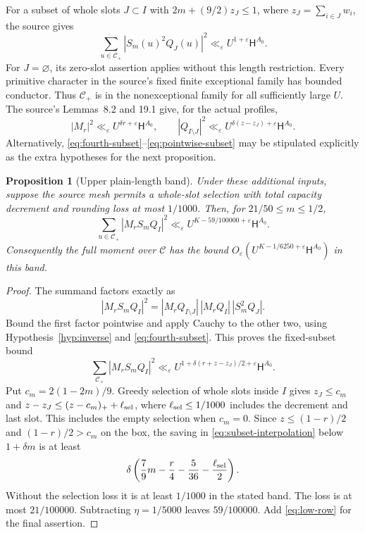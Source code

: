 \documentclass[11pt]{article}
\newtheorem{proposition}[theorem]{Proposition}
\theoremstyle{definition}
\theoremstyle{remark}
\numberwithin{equation}{section}
\newcommand{\CC}{\mathcal C}
\newcommand{\HH}{\mathsf H}
\newcommand{\ee}{\varepsilon}
\begin{document}
For a subset of whole slots $J\subset I$ with
$2m+(9/2)z_J\le1$, where $z_J=\sum_{i\in J}w_i$, the source gives
\begin{equation}\label{eq:fourth-subset}
\sum_{u\in\CC_+}|S_m(u)^2Q_J(u)|^2
\ll_\ee U^{1+\ee}\HH^{A_0}.
\end{equation}
For $J=\varnothing$, its zero-slot assertion applies without this
length restriction. Every primitive character in the source's fixed
finite exceptional family has bounded conductor. Thus $\CC_+$ is
in the nonexceptional family for all sufficiently large $U$.
The source's Lemmas~8.2 and 19.1 give, for the actual profiles,
\begin{equation}\label{eq:pointwise-subset}
|M_r|^2\ll_\ee U^{\delta r+\ee}\HH^{A_0},\qquad
|Q_{I\setminus J}|^2\ll_\ee
 U^{\delta(z-z_J)+\ee}\HH^{A_0}.
\end{equation}
Alternatively, \eqref{eq:fourth-subset}--\eqref{eq:pointwise-subset}
may be stipulated explicitly as the extra hypotheses for the next
proposition.

\begin{proposition}[Upper plain-length band]\label{prop:upper-band}
Under these additional inputs, suppose the source mesh permits a
whole-slot selection with total capacity decrement and rounding loss
at most $1/1000$. Then, for $21/50\le m\le1/2$,
\begin{equation}\label{eq:upper-band}
\sum_{u\in\CC_+}|M_rS_mQ_I|^2
\ll_\ee U^{K-59/100000+\ee}\HH^{A_0}.
\end{equation}
Consequently the full moment over $\CC$ has the bound
$O_\ee(U^{K-1/6250+\ee}\HH^{A_0})$ in this band.
\end{proposition}
\begin{proof}
The summand factors exactly as
\[
|M_rS_mQ_I|^2
=|M_rQ_{I\setminus J}|\,|M_rQ_I|\,|S_m^2Q_J|.
\]
Bound the first factor pointwise and apply Cauchy to the other two,
using Hypothesis~\ref{hyp:inverse} and \eqref{eq:fourth-subset}.
This proves the fixed-subset bound
\begin{equation}\label{eq:subset-interpolation}
\sum_{\CC_+}|M_rS_mQ_I|^2
\ll_\ee U^{1+\delta(r+z-z_J)/2+\ee}\HH^{A_0}.
\end{equation}
Put $c_m=2(1-2m)/9$. Greedy selection of whole slots inside $I$
gives $z_J\le c_m$ and
$z-z_J\le(z-c_m)_++\ell_{\rm sel}$, where
$\ell_{\rm sel}\le1/1000$ includes the decrement and last slot.
This includes the empty selection when $c_m=0$.
Since $z\le(1-r)/2$ and $(1-r)/2>c_m$ on the box, the saving in
\eqref{eq:subset-interpolation} below $1+\delta m$ is at least
\[
\delta\left(\frac79m-\frac r4-\frac5{36}
 -\frac{\ell_{\rm sel}}2\right).
\]
Without the selection loss it is at least $1/1000$ in the stated
band. The loss is at most $21/100000$. Subtracting $\eta=1/5000$
leaves $59/100000$. Add \eqref{eq:low-row} for the final assertion.
\end{proof}
\end{document}
